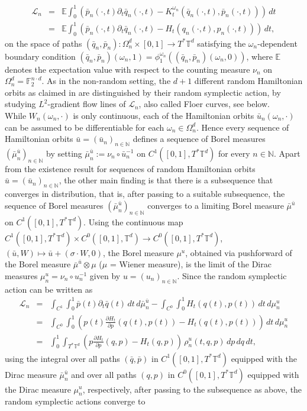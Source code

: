 \documentclass[a4paper,11pt]{amsart}
\newcommand{\NN}{\mathbb{N}}
\newcommand{\TT}{\mathbb{T}}
\newcommand{\FF}{\mathbb{F}}
\newcommand{\EE}{\mathbb{E}}
\begin{document}
\begin{eqnarray*} \mathcal{L}_n &=&\EE\int_0^1 \left(\bar{p}_n(\cdot,t)\partial_t\bar{q}_n(\cdot,t)-K^{\omega_n}_t(\bar{q}_n(\cdot,t),\bar{p}_n(\cdot,t))\right)\,dt\\  &=&\EE\int_0^1 \left(\bar{p}_n(\cdot,t)\partial_t\bar{q}_n(\cdot,t)-H_t(q_n(\cdot,t),p_n(\cdot,t))\right)\,dt,\end{eqnarray*} on the space of paths $(\bar{q}_n,\bar{p}_n):\Omega_n^d\times [0,1]\to T^*\TT^d$ satisfying the $\omega_n$-dependent boundary condition $(\bar{q}_n,\bar{p}_n)(\omega_n,1)=\phi^{\omega_n}_1((\bar{q}_n,\bar{p}_n)(\omega_n,0))$, 
where $\EE$ denotes the expectation value with respect to the counting measure $\nu_n$ on $\Omega_n^d=\FF_2^{n\cdot d}$. As in the non-random setting, the $d+1$ different random Hamiltonian orbits as claimed in  are distinguished by their random symplectic action, by studying $L^2$-gradient flow lines of $\mathcal{L}_n$, also called Floer curves, see below.\\
\indent While $W_n(\omega_n,\cdot)$ is only continuous, each of the Hamiltonian orbits $\bar{u}_n(\omega_n,\cdot)$ can be assumed to be differentiable for each $\omega_n\in\Omega_n^d$. Hence every sequence of Hamiltonian orbits $\bar{u}=(\bar{u}_n)_{n\in\NN}$ defines a sequence of Borel measures $(\bar{\mu}_n^{\bar{u}})_{n\in\NN}$ by setting $\bar{\mu}_n^{\bar{u}}:=\nu_n\circ \bar{u}_n^{-1}$ on $C^1([0,1],T^*\TT^d)$ for every $n\in\NN$. Apart from the existence result for sequences of random Hamiltonian orbits $\bar{u}=(\bar{u}_n)_{n\in\NN}$, the other main finding is that there is a subsequence that converges in distribution, that is, after passing to a suitable subsequence, the sequence of Borel measures $(\bar{\mu}_n^{\bar{u}})_{n\in\NN}$ converges to a limiting Borel measure $\bar{\mu}^{\bar{u}}$ on $C^1([0,1],T^*\TT^d)$. Using the continuous map $C^1([0,1],T^*\TT^d)\times C^0([0,1],\TT^d)\to C^0([0,1],T^*\TT^d)$, $(\bar{u},W)\mapsto \bar{u}+(\sigma\cdot W,0)$, the Borel measure $\mu^u$, obtained via pushforward of the Borel measure $\bar{\mu}^{\bar{u}}\otimes\mu$ ($\mu$ = Wiener measure), is the limit of the Dirac measures $\mu_n^u=\nu_n\circ u_n^{-1}$ given by $u=(u_n)_{n\in\NN}$. Since the random symplectic action can be written as 
\begin{eqnarray*}
\mathcal{L}_n&=&\int_{C^1}\int_0^1 \bar{p}(t)\partial_t\bar{q}(t)\,dt\,d\bar{\mu}_n^{\bar{u}} - \int_{C^0} \int_0^1 H_t(q(t),p(t))\,dt\,d\mu_n^u\\
&=&\int_{C^0}\int_0^1 \left(p(t)\frac{\partial H_t}{\partial p}(q(t),p(t))- H_t(q(t),p(t))\right)\,dt\,d\mu_n^u\\
&=&\int_0^1\int_{T^*\TT^d} \left(p\frac{\partial H_t}{\partial p}(q,p)- H_t(q,p)\right)\,\rho^u_n(t,q,p) \,dp\,dq \,dt,
\end{eqnarray*} using the integral over all paths $(\bar{q},\bar{p})$ in $C^1([0,1],T^*\TT^d)$ equipped with the Dirac measure $\bar{\mu}^{\bar{u}}_n$ and over all paths $(q,p)$ in $C^0([0,1],T^*\TT^d)$ equipped with the Dirac measure $\mu^u_n$, respectively, after passing to the subsequence as above, the random symplectic actions converge to \
\end{document}
